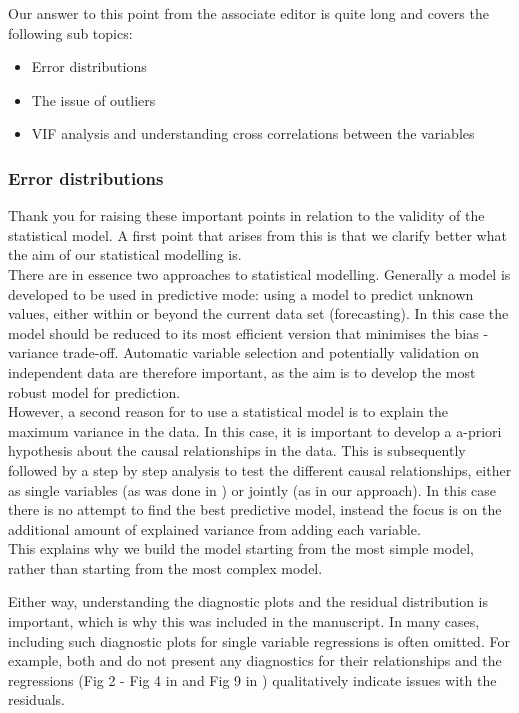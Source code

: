 \documentclass[]{elsarticle} %
\providecommand{\tightlist}{%
  \setlength{\itemsep}{0pt}\setlength{\parskip}{0pt}}
\begin{document}
Our answer to this point from the associate editor is quite long and covers the following sub topics:

\begin{itemize}
\tightlist
\item
  Error distributions\\
\item
  The issue of outliers\\
\item
  VIF analysis and understanding cross correlations between the variables
\end{itemize}

\hypertarget{error-distributions}{%
\subsubsection{Error distributions}\label{error-distributions}}

Thank you for raising these important points in relation to the validity of the statistical model.
A first point that arises from this is that we clarify better what the aim of our statistical modelling is.\\
There are in essence two approaches to statistical modelling. Generally a model is developed to be used in predictive mode: using a model to predict unknown values, either within or beyond the current data set (forecasting). In this case the model should be reduced to its most efficient version that minimises the bias - variance trade-off. Automatic variable selection and potentially validation on independent data are therefore important, as the aim is to develop the most robust model for prediction.\\
However, a second reason for to use a statistical model is to explain the maximum variance in the data. In this case, it is important to develop a a-priori hypothesis about the causal relationships in the data. This is subsequently followed by a step by step analysis to test the different causal relationships, either as single variables (as was done in \citet{zhang2017}) or jointly (as in our approach). In this case there is no attempt to find the best predictive model, instead the focus is on the additional amount of explained variance from adding each variable.\\
This explains why we build the model starting from the most simple model, rather than starting from the most complex model.

Either way, understanding the diagnostic plots and the residual distribution is important, which is why this was included in the manuscript. In many cases, including such diagnostic plots for single variable regressions is often omitted. For example, both \citet{zhang2017} and \citet{filoso2017} do not present any diagnostics for their relationships and the regressions (Fig 2 - Fig 4 in \citet{zhang2017} and Fig 9 in \citet{filoso2017}) qualitatively indicate issues with the residuals.
\end{document}
